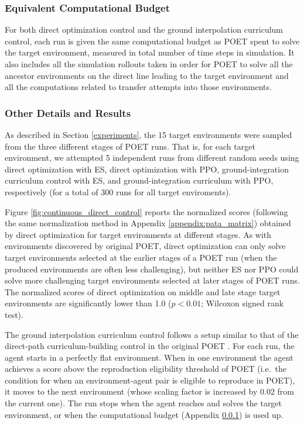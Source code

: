 \documentclass{article}
\begin{document}
\subsubsection{Equivalent Computational Budget}
\label{appendix:equal_budget}

For both direct optimization control and the ground interpolation curriculum control, each run is given the same computational budget as POET spent to solve the target environment, measured in total number of time steps in simulation. It also includes all the simulation rollouts taken in order for POET to solve all the ancestor environments on the direct line leading to the target environment and  all the computations related to transfer attempts into those environments.  

\subsubsection{Other Details and Results}
\label{appendix:additional_control}

As described in Section \ref{experiments}, the 15 target environments were sampled from the three different stages of POET runs. 
That is, for each target environment, we attempted 5 independent runs from different random seeds using direct optimization with ES, direct optimization with PPO, ground-integration curriculum control with ES, and ground-integration curriculum with PPO, respectively (for a total of 300 runs for all target enviroments). 

Figure \ref{fig:continuous_direct_control} reports the normalized scores (following the same normalization method in Appendix \ref{appendix:pata_matrix}) obtained by direct optimization for target environments at different stages. As with environments discovered by original POET, direct optimization can only solve target environments selected at the earlier stages of a POET run (when the produced environments are often less challenging), but neither ES nor PPO could solve more challenging target environments selected at later stages of POET runs. The normalized scores of direct optimization on middle and late stage target environments are significantly lower than 1.0 ($p < 0.01$; Wilcoxon signed rank test).  

The ground interpolation curriculum control follows a setup similar to that of the direct-path curriculum-building control in the original POET \cite{wang2019paired, wang2019poetGECCO}. For each run, the agent starts in a perfectly flat environment. When in one environment the agent achieves a score above the reproduction eligibility threshold of POET (i.e.\ the condition for when an environment-agent pair is eligible to reproduce in POET),  it moves to the next environment (whose scaling factor is increased by 0.02 from the current one). The run stops when the agent reaches and solves the target environment, or when the computational budget (Appendix \ref{appendix:equal_budget}) is used up.
\end{document}
